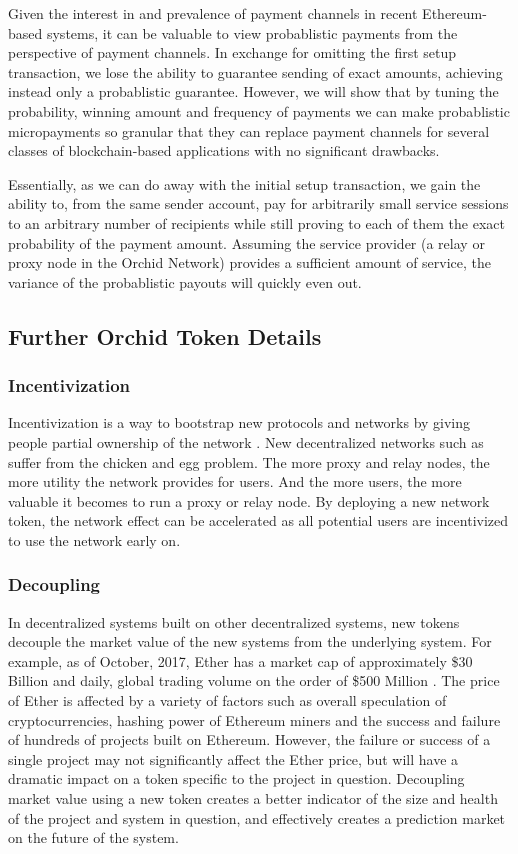 Given the interest in and prevalence of payment channels in recent Ethereum-based systems, it can be valuable to view probablistic payments from the perspective of payment channels. In exchange for omitting the first setup transaction, we lose the ability to guarantee sending of exact amounts, achieving instead only a probablistic guarantee. However, we will show that by tuning the probability, winning amount and frequency of payments we can make probablistic micropayments so granular that they can replace payment channels for several classes of blockchain-based applications with no significant drawbacks.

Essentially, as we can do away with the initial setup transaction, we gain the ability to, from the same sender account, pay for arbitrarily small service sessions to an arbitrary number of recipients while still proving to each of them the exact probability of the payment amount. Assuming the service provider (a relay or proxy node in the Orchid Network) provides a sufficient amount of service, the variance of the probablistic payouts will quickly even out.

\subsection{Further Orchid Token Details}

\subsubsection{Incentivization}

Incentivization is a way to bootstrap new protocols and networks by giving people partial ownership of the network \cite{AppCoins}. New decentralized networks such as \Orchid{} suffer from the chicken and egg problem. The more proxy and relay nodes, the more utility the network provides for users. And the more users, the more valuable it becomes to run a proxy or relay node. By deploying a new network token, the network effect can be accelerated as all potential users are incentivized to use the network early on.

\subsubsection{Decoupling}

In decentralized systems built on other decentralized systems, new tokens decouple the market value of the new systems from the underlying system. For example, as of October, 2017, Ether has a market cap of approximately \$30 Billion and daily, global trading volume on the order of \$500 Million \cite{onchainfx}. The price of Ether is affected by a variety of factors such as overall speculation of cryptocurrencies, hashing power of Ethereum miners and the success and failure of hundreds of projects built on Ethereum. However, the failure or success of a single project may not significantly affect the Ether price, but will have a dramatic impact on a token specific to the project in question. Decoupling market value using a new token creates a better indicator of the size and health of the project and system in question, and effectively creates a prediction market on the future of the system.

